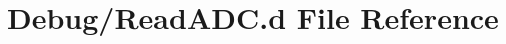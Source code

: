 \hypertarget{_read_a_d_c_8d}{}\section{Debug/\+Read\+A\+DC.d File Reference}
\label{_read_a_d_c_8d}
